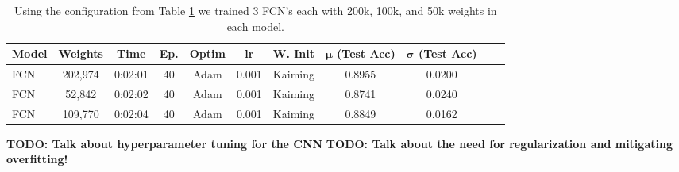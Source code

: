\documentclass[11pt]{amsart}
\begin{document}
\begin{table}[h]
    \centering
    \begin{tabular}{|l|c|c|c|c|c|c|c|c|c|c|} %
        \hline
        \textbf{Model} & \textbf{Weights}
        & \textbf{Time} & \textbf{Ep.}
        & \textbf{Optim}
        & \textbf{lr} & \textbf{W. Init}  & \textbf{$\bm \mu$ (Test Acc)}
        & \textbf{$\bm \sigma$ (Test Acc)} \\ 
        \hline
        FCN & 202,974 & 0:02:01 & 40  & Adam & 0.001 & Kaiming & 0.8955 & 0.0200 \\
        \hline
        FCN & 52,842 & 0:02:02 & 40  & Adam & 0.001 & Kaiming & 0.8741 & 0.0240 \\
        \hline
        FCN & 109,770 & 0:02:04	 & 40  & Adam & 0.001 & Kaiming & 0.8849 & 0.0162 \\
        \hline
    \end{tabular}
    \caption{Using the configuration from Table \ref{tab:best_model} we trained 3 FCN's each with 200k, 100k, and 50k weights in each model.}
    \label{tab:best_model}
\end{table}

\textbf{TODO: Talk about hyperparameter tuning for the CNN}
\textbf{TODO: Talk about the need for regularization and mitigating overfitting!}

\end{document}
